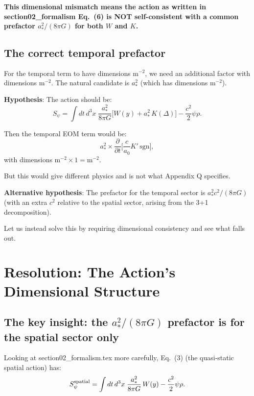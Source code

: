 \documentclass[11pt]{article}
\begin{document}
\textbf{This dimensional mismatch means the action as written in section02\_formalism Eq.~(6) is NOT self-consistent with a common prefactor $a_*^2/(8\pi G)$ for both $W$ and $K$.}

\subsection{The correct temporal prefactor}

For the temporal term to have dimensions $\text{m}^{-2}$, we need an additional factor with dimensions $\text{m}^{-2}$. The natural candidate is $a_*^2$ (which has dimensions $\text{m}^{-2}$).

\textbf{Hypothesis}: The action should be:
\begin{equation}
S_\psi = \int dt\,d^3x\;\frac{a_*^2}{8\pi G}\biggl[
  W(y) + a_*^2\,K(\Delta)
\biggr] - \frac{c^2}{2}\psi\rho.
\label{eq:hypothesis-action}
\end{equation}

Then the temporal EOM term would be:
\begin{equation}
a_*^2 \times \frac{\partial}{\partial t}\biggl[\frac{c}{a_0}K'\,\text{sgn}\biggr],
\end{equation}
with dimensions $\text{m}^{-2} \times 1 = \text{m}^{-2}$. \checkmark

But this would give different physics and is not what Appendix Q specifies.

\textbf{Alternative hypothesis}: The prefactor for the temporal sector is $a_*^2 c^2/(8\pi G)$ (with an extra $c^2$ relative to the spatial sector, arising from the 3+1 decomposition).

Let us instead solve this by requiring dimensional consistency and see what falls out.


\section{Resolution: The Action's Dimensional Structure}

\subsection{The key insight: the $a_*^2/(8\pi G)$ prefactor is for the spatial sector only}

Looking at section02\_formalism.tex more carefully, Eq.~(3) (the quasi-static spatial action) has:
\begin{equation}
S_\psi^{\rm spatial} = \int dt\,d^3x\;\frac{a_*^2}{8\pi G}\,W(y)
- \frac{c^2}{2}\psi\rho.
\end{equation}
\end{document}
